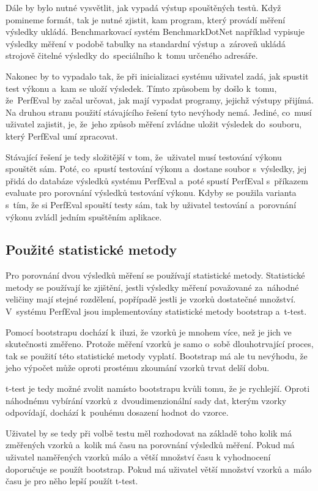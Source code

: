 Dále by bylo nutné vysvětlit, jak vypadá výstup spouštěných testů. Když pomineme formát, tak je nutné zjistit,
kam program, který provádí měření výsledky ukládá. Benchmarkovací systém BenchmarkDotNet například vypisuje
výsledky měření v podobě tabulky na standardní výstup a~zároveň ukládá strojově čitelné výsledky do~speciálního
k~tomu určeného adresáře.

Nakonec by to vypadalo tak, že při inicializaci systému uživatel zadá, jak spustit test výkonu a~kam se uloží výsledek.
Tímto způsobem by došlo k~tomu, že~PerfEval by začal určovat, jak mají vypadat programy, jejichž výstupy přijímá.
Na druhou stranu použití stávajícího řešení tyto nevýhody nemá. Jediné, co~musí uživatel zajistit, je, že~jeho
způsob měření zvládne uložit výsledek do~souboru, který PerfEval umí zpracovat.

Stávající řešení je tedy složitější v tom, že~uživatel musí testování výkonu spouštět sám. Poté, co~spustí testování
výkonu a~dostane soubor s~výsledky, jej přidá do databáze výsledků systému PerfEval a~poté spustí PerfEval s~příkazem evaluate
pro porovnání výsledků testování výkonu. Kdyby se použila varianta s~tím, že si PerfEval spouští testy sám, tak
by uživatel testování a~porovnání výkonu zvládl jedním spuštěním aplikace.

\subsection{Použité statistické metody}
Pro porovnání dvou výsledků měření se používají statistické metody. Statistické metody se používají ke zjištění,
jestli výsledky měření považované za~náhodné veličiny mají stejné rozdělení, popřípadě jestli je vzorků dostatečné množství.
V~systému PerfEval jsou implementovány statistické metody bootstrap a~t-test.

Pomocí bootstrapu dochází k~iluzi, že vzorků je mnohem více, než je jich ve skutečnosti změřeno. Protože měření vzorků
je samo o~sobě dlouhotrvající proces, tak se použití této statistické metody vyplatí. Bootstrap má ale tu nevýhodu, že jeho výpočet
může oproti prostému zkoumání vzorků trvat delší dobu.

t-test je tedy možné zvolit namísto bootstrapu kvůli tomu, že je rychlejší. Oproti náhodnému vybírání vzorků z~dvoudimenzionální sady
dat, kterým vzorky odpovídají, dochází k~pouhému dosazení hodnot do vzorce.

Uživatel by se tedy při volbě testu měl rozhodovat na základě toho kolik má změřených vzorků a~kolik má času na porovnání
výsledků měření. Pokud má uživatel naměřených vzorků málo a větší množství času k vyhodnocení doporučuje se použít bootstrap.
Pokud má uživatel větší množství vzorků a~málo času je pro něho lepší použít t-test.

